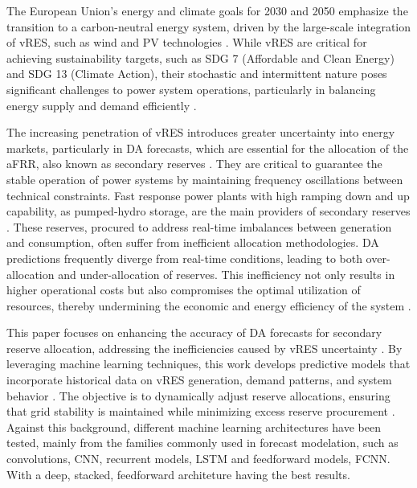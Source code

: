 The European Union's energy and climate goals for 2030 and 2050 emphasize the transition to a carbon-neutral energy system, driven by the large-scale integration of \gls{vRES}, such as wind and \gls{PV} technologies \cite{Franc:21,Perissi2022,Dobrowolski:22}. While \gls{vRES} are critical for achieving sustainability targets, such as \gls{SDG} 7 (Affordable and Clean Energy) and \gls{SDG} 13 (Climate Action), their stochastic and intermittent nature poses significant challenges to power system operations, particularly in balancing energy supply and demand efficiently \cite{Ocker2017,Frade2019_wind}.  \par
The increasing penetration of \gls{vRES} introduces greater uncertainty into energy markets, particularly in \gls{DA} forecasts, which are essential for the allocation of the \gls{aFRR}, also known as secondary reserves \cite{Algarvio:19c,Skytte:19}. They are critical to guarantee the stable operation of power systems by maintaining frequency oscillations between technical constraints. Fast response power plants with high ramping down and up capability, as pumped-hydro storage, are the main providers of secondary reserves \cite{Algarvio:20}. These reserves, procured to address real-time imbalances between generation and consumption, often suffer from inefficient allocation methodologies. \gls{DA} predictions frequently diverge from real-time conditions, leading to both over-allocation and under-allocation of reserves. This inefficiency not only results in higher operational costs but also compromises the optimal utilization of resources, thereby undermining the economic and energy efficiency of the system \cite{Algarvio:24,Frade:19c}.\par
This paper focuses on enhancing the accuracy of \gls{DA} forecasts for secondary reserve allocation, addressing the inefficiencies caused by \gls{vRES} uncertainty \cite{Algarvio:19b,Knorr:19}. By leveraging machine learning techniques, this work develops predictive models that incorporate historical data on \gls{vRES} generation, demand patterns, and system behavior \cite{DeVos2019,Kruse2022} . The objective is to dynamically adjust reserve allocations, ensuring that grid stability is maintained while minimizing excess reserve procurement \cite{Algarvio:24,Algarvio2024}. 
\textcolor[rgb]{0,0,0.5}{Against this background, different machine learning architectures have been tested, mainly from the families commonly used in forecast modelation, such as convolutions, \gls{CNN}, recurrent models, \gls{LSTM} and feedforward models, \gls{FCNN}. With a deep, stacked, feedforward architeture having the best results.}\par
